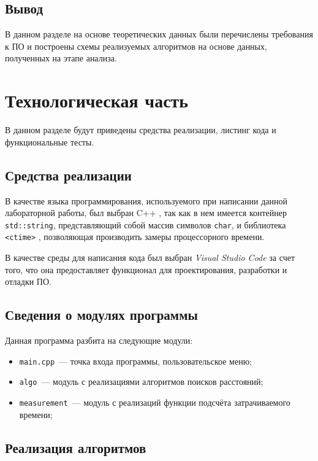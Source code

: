 \section*{Вывод}

В данном разделе на основе теоретических данных были перечислены требования к ПО и построены схемы реализуемых алгоритмов на основе данных, полученных на этапе анализа.

\clearpage

\chapter{Технологическая часть}
В данном разделе будут приведены средства реализации, листинг кода и функциональные тесты.

\section{Средства реализации}

В качестве языка программирования, используемого при написании данной лабораторной работы, был выбран C++ \cite{cpp-lang}, так как в нем имеется контейнер \texttt{std::string}, представляющий собой массив символов \texttt{char}, и библиотека \texttt{<ctime>} \cite{ctime}, позволяющая производить замеры процессорного времени.

В качестве среды для написания кода был выбран \textit{Visual Studio Code} за счет того, что она предоставляет функционал для проектирования, разработки и отладки ПО.

\section{Сведения о модулях программы}

Данная программа разбита на следующие модули:

\begin{itemize}
    \item \texttt{main.cpp}~--- точка входа программы, пользовательское меню;
    \item \texttt{algo}~--- модуль с реализациями алгоритмов поисков расстояний;
    \item \texttt{measurement}~--- модуль с реализаций функции подсчёта затрачиваемого времени;
\end{itemize}

\clearpage

\section{Реализация алгоритмов}

